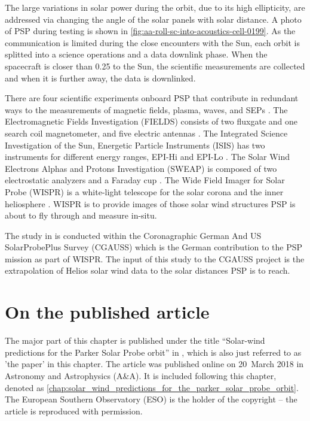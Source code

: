 The large variations in solar power during the orbit, due to its high ellipticity, are addressed via changing the angle of the solar panels with solar distance. A photo of PSP during testing is shown in \autoref{fig:aa-roll-sc-into-acoustics-cell-0199}. As the communication is limited during the close encounters with the Sun, each orbit is splitted into a science operations and a data downlink phase. When the spacecraft is closer than \SI{0.25}{\au} to the Sun, the scientific measurements are collected and when it is further away, the data is downlinked.

There are four scientific experiments onboard PSP that contribute in redundant ways to the measurements of magnetic fields, plasma, waves, and SEPs \citep{Fox2015}.
The Electromagnetic Fields Investigation (FIELDS) consists of two fluxgate and one search coil magnetometer, and five electric antennas \citep{Bale2016}. %
The Integrated Science Investigation of the Sun, Energetic Particle Instruments (IS\sun{}IS) has two instruments for different energy ranges, EPI-Hi and EPI-Lo \citep{McComas2016}. %
The Solar Wind Electrons Alphas and Protons Investigation (SWEAP) is composed of two electrostatic analyzers and a Faraday cup \citep{Kasper2016}. %
The Wide Field Imager for Solar Probe (WISPR) is a white-light telescope for the solar corona and the inner heliosphere \citep{Vourlidas2016}. WISPR is to provide images of those solar wind structures PSP is about to fly through and measure in-situ. %

The study in \citet{Venzmer2018} is conducted within the Coronagraphic German And US SolarProbePlus Survey (CGAUSS) which is the German contribution to the PSP mission as part of WISPR. The input of this study to the CGAUSS project is the extrapolation of Helios solar wind data to the solar distances PSP is to reach.


\section{On the published article}
\label{sec:on_the_published_article}
The major part of this chapter is published under the title ``Solar-wind predictions for the Parker Solar Probe orbit'' in \citet{Venzmer2018}, which is also just referred to as 'the paper' in this chapter. The article was published online on 20~March 2018 in Astronomy and Astrophysics (A\&A). It is included following this chapter, denoted as \autoref{chap:solar_wind_predictions_for_the_parker_solar_probe_orbit}. The European Southern Observatory (ESO) is the holder of the copyright -- the article is reproduced with permission.

